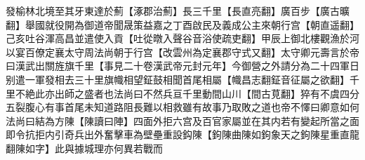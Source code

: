 發榆林北境至其牙東達於薊【涿郡治薊】長三千里【長直亮翻】廣百步【廣古曠翻】舉國就役開為御道帝聞晟策益嘉之丁酉啟民及義成公主來朝行宫【朝直遥翻】己亥吐谷渾高昌並遣使入貢【吐從暾入聲谷音浴使疏吏翻】甲辰上御北樓觀漁於河以宴百僚定襄太守周法尚朝于行宫【改雲州為定襄郡守式又翻】太守卿元壽言於帝曰漢武出關旌旗千里【事見二十卷漢武帝元封元年】今御營之外請分為二十四軍日别遣一軍發相去三十里旗幟相望鉦鼓相聞首尾相屬【幟昌志翻鉦音征屬之欲翻】千里不絶此亦出師之盛者也法尚曰不然兵亘千里動間山川【間古莧翻】猝有不虞四分五裂腹心有事首尾未知道路阻長難以相救雖有故事乃取敗之道也帝不懌曰卿意如何法尚曰結為方陳【陳讀曰陣】四面外拒六宫及百官家屬並在其内若有變起所當之面即令抗拒内引奇兵出外奮擊車為壁壘重設鈎陳【鉤陳曲陳如鉤象天之鉤陳星重直龍翻陳如字】此與據城理亦何異若戰而